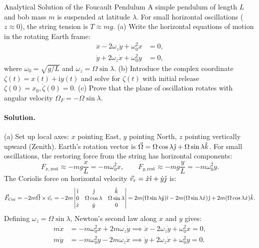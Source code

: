 \begin{workedexample}{Analytical Solution of the Foucault Pendulum}
A simple pendulum of length $L$ and bob mass $m$ is suspended at latitude $\lambda$. For small horizontal oscillations ($z \approx 0$), the string tension is $T \approx mg$.
(a) Write the horizontal equations of motion in the rotating Earth frame:
\begin{align*}
\ddot{x} - 2\omega_z\dot{y} + \omega_0^2 x &= 0, \\
\ddot{y} + 2\omega_z\dot{x} + \omega_0^2 y &= 0,
\end{align*}
where $\omega_0 = \sqrt{g/L}$ and $\omega_z = \Omega\sin\lambda$.
(b) Introduce the complex coordinate $\zeta(t) = x(t) + \mathrm{i}y(t)$ and solve for $\zeta(t)$ with initial release $\zeta(0) = x_0, \dot{\zeta}(0) = 0$.
(c) Prove that the plane of oscillation rotates with angular velocity $\Omega_F = -\Omega\sin\lambda$.

\paragraph{Solution.}

(a) Set up local axes: $x$ pointing East, $y$ pointing North, $z$ pointing vertically upward (Zenith).
Earth's rotation vector is $\vec{\Omega} = \Omega\cos\lambda\hat{\jmath} + \Omega\sin\lambda\hat{k}$.
For small oscillations, the restoring force from the string has horizontal components:
\[
F_{x,\text{rest}} \approx -mg\frac{x}{L} = -m\omega_0^2 x, \qquad F_{y,\text{rest}} \approx -mg\frac{y}{L} = -m\omega_0^2 y.
\]
The Coriolis force on horizontal velocity $\vec{v}_r = \dot{x}\hat{\imath} + \dot{y}\hat{\jmath}$ is:
\[
\vec{F}_{\text{Cor}} = -2m\vec{\Omega}\times\vec{v}_r = -2m\begin{vmatrix} \hat{\imath} & \hat{\jmath} & \hat{k} \\ 0 & \Omega\cos\lambda & \Omega\sin\lambda \\ \dot{x} & \dot{y} & 0 \end{vmatrix} = 2m(\Omega\sin\lambda\dot{y})\hat{\imath} - 2m(\Omega\sin\lambda\dot{x})\hat{\jmath} + 2m(\Omega\cos\lambda\dot{x})\hat{k}.
\]
Defining $\omega_z = \Omega\sin\lambda$, Newton's second law along $x$ and $y$ gives:
\begin{align*}
m\ddot{x} &= -m\omega_0^2 x + 2m\omega_z\dot{y} \implies \boxed{\ddot{x} - 2\omega_z\dot{y} + \omega_0^2 x = 0,} \\
m\ddot{y} &= -m\omega_0^2 y - 2m\omega_z\dot{x} \implies \boxed{\ddot{y} + 2\omega_z\dot{x} + \omega_0^2 y = 0.}
\end{align*}


\end{workedexample}
